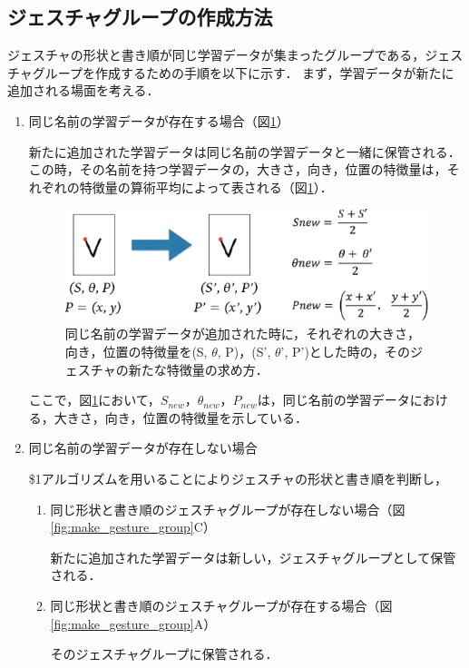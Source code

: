 \subsection{ジェスチャグループの作成方法}
ジェスチャの形状と書き順が同じ学習データが集まったグループである，ジェスチャグループを作成するための手順を以下に示す．
まず，学習データが新たに追加される場面を考える．
\begin{enumerate}
\renewcommand{\labelenumi}{\Alph{enumi}.}
\item 同じ名前の学習データが存在する場合（図\ref{fig:same_gesture}）

新たに追加された学習データは同じ名前の学習データと一緒に保管される．この時，その名前を持つ学習データの，大きさ，向き，位置の特徴量は，それぞれの特徴量の算術平均によって表される（図\ref{fig:same_gesture}）．

\begin{figure} [h!]
	\begin{center}
		\includegraphics [width=0.9\hsize ]{img/same_gesture.eps}
	\end{center}
	\caption{同じ名前の学習データが追加された時に，それぞれの大きさ，向き，位置の特徴量を(S, $\theta$, P)，(S', $\theta$', P')とした時の，そのジェスチャの新たな特徴量の求め方．}
	\label{fig:same_gesture}
\end{figure}

ここで，図\ref{fig:same_gesture}において，$S_\textit{new}$，$\theta_\textit{new}$，$P_\textit{new}$は，同じ名前の学習データにおける，大きさ，向き，位置の特徴量を示している．

 
\item 同じ名前の学習データが存在しない場合

\$1アルゴリズムを用いることによりジェスチャの形状と書き順を判断し，

\begin{enumerate}
\renewcommand{\labelenumi}{\alph{enumi}.}

\item 同じ形状と書き順のジェスチャグループが存在しない場合（図\ref{fig:make_gesture_group}C）
 
新たに追加された学習データは新しい，ジェスチャグループとして保管される．
   
\item 同じ形状と書き順のジェスチャグループが存在する場合（図\ref{fig:make_gesture_group}A）

そのジェスチャグループに保管される．

\end{enumerate}
\end{enumerate}

